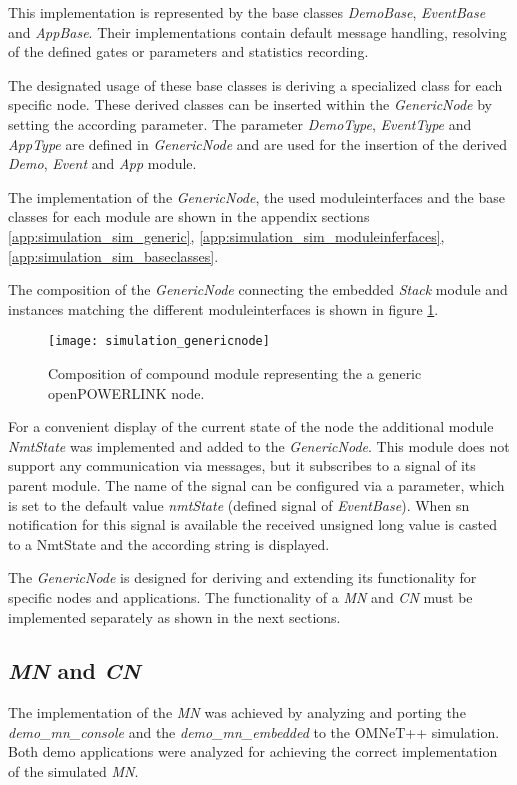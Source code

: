This implementation is represented by the base classes \emph{DemoBase}, \emph{EventBase} and \emph{AppBase}.
Their implementations contain default message handling, resolving of the defined gates or parameters and statistics recording.

The designated usage of these base classes is deriving a specialized class for each specific node.
These derived classes can be inserted within the \emph{GenericNode} by setting the according parameter.
The parameter \emph{DemoType}, \emph{EventType} and \emph{AppType} are defined in \emph{GenericNode} and are used for the insertion of the derived \emph{Demo}, \emph{Event} and \emph{App} module.

The implementation of the \emph{GenericNode}, the used moduleinterfaces and the base classes for each module are shown in the appendix sections \ref{app:simulation_sim_generic}, \ref{app:simulation_sim_moduleinferfaces}, \ref{app:simulation_sim_baseclasses}.

The composition of the \emph{GenericNode} connecting the embedded \emph{Stack} module and instances matching the different moduleinterfaces is shown in figure \ref{fig:simulation_genericnode}.

\begin{figure}
    \centering
    \texttt{[image: simulation\_genericnode]}
    \caption{Composition of compound module representing the a generic openPOWERLINK node.}
    \label{fig:simulation_genericnode}
\end{figure}

For a convenient display of the current state of the node the additional module \emph{NmtState} was implemented and added to the \emph{GenericNode}.
This module does not support any communication via messages, but it subscribes to a signal of its parent module.
The name of the signal can be configured via a parameter, which is set to the default value \emph{nmtState} (defined signal of \emph{EventBase}).
When sn notification for this signal is available the received unsigned long value is casted to a NmtState and the according string is displayed.

The \emph{GenericNode} is designed for deriving and extending its functionality for specific nodes and applications.
The functionality of a \emph{MN} and \emph{CN} must be implemented separately as shown in the next sections.

\subsection{\emph{MN} and \emph{CN}}
\label{sec:porting_nodes_mn_cm}
The implementation of the \emph{MN} was achieved by analyzing and porting the \emph{demo\_mn\_console} and the \emph{demo\_mn\_embedded} to the OMNeT++ simulation.
Both demo applications were analyzed for achieving the correct implementation of the simulated \emph{MN}.

